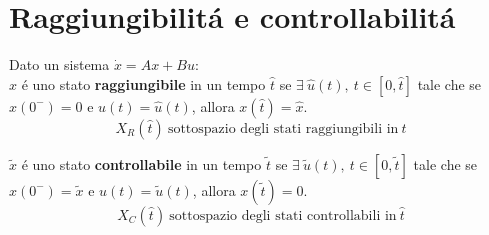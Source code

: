 \documentclass[../main.tex]{subfiles}
\begin{document}
	\makeatletter
	\newcommand{\setword}[2]{%
		\phantomsection
		#1\def\@currentlabel{\unexpanded{#1}}\label{#2}%
	}
	\makeatother
	
	\section{Raggiungibilit\'a e controllabilit\'a}
		Dato un sistema $ \dot x = A x + B u $:\\
		
		$ \hat x $ \'e uno stato \textbf{raggiungibile} in un tempo $ \hat t $ se $ \exists\ \hat u(t),\ t \in [0, \hat t] $ tale che se $ x(0^-) = 0 $ e $ u(t) = \hat u(t) $, allora $ x(\hat t) = \hat x $.
		\[
			X_R(\hat t)\ \text{sottospazio degli stati raggiungibili in}\ \hat t
		\]
		
		$ \tilde x $ \'e uno stato \textbf{controllabile} in un tempo $ \tilde t $ se $ \exists\ \tilde u(t),\ t \in [0, \tilde t] $ tale che se $ x(0^-) = \tilde x $ e $ u(t) = \tilde u(t) $, allora $ x(\tilde t) = 0 $.
		\[ X_C(\hat t)\ \text{sottospazio degli stati controllabili in}\ \hat t \]
		
\end{document}
